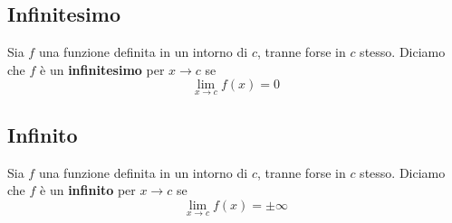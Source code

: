 \documentclass{book}
\begin{document}
\begin{definition}
  \subsection{Infinitesimo}
  Sia \(f\) una funzione definita in un intorno di \(c\), tranne forse in \(c\) stesso. Diciamo che \(f\) è un \textbf{infinitesimo} per \(x \to c\) se
  \[
    \lim_{x \to c} f(x) = 0
  \]
\end{definition}
\begin{definition}
  \subsection{Infinito}
  Sia \(f\) una funzione definita in un intorno di \(c\), tranne forse in \(c\) stesso. Diciamo che \(f\) è un \textbf{infinito} per \(x \to c\) se
  \[
    \lim_{x \to c} f(x) = \pm \infty
  \]
\end{definition}
\end{document}
